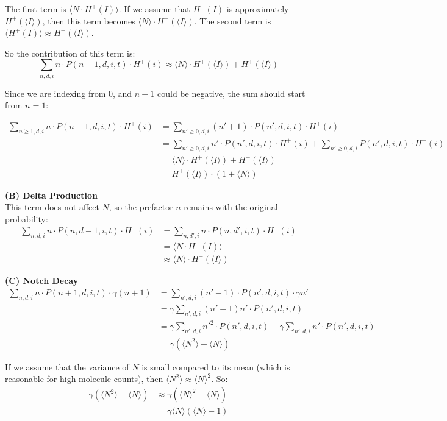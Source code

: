 \documentclass{article}
\begin{document}
\begin{flushleft}
The first term is $\langle N \cdot H^+(I) \rangle$. If we assume that $H^+(I)$ is approximately $H^+(\langle I \rangle)$, then this term becomes $\langle N \rangle \cdot H^+(\langle I \rangle)$. The second term is $\langle H^+(I) \rangle \approx H^+(\langle I \rangle)$. 

So the contribution of this term is:
\[
\sum_{n,d,i} n \cdot P(n-1,d,i,t) \cdot H^+(i) \approx \langle N \rangle \cdot H^+(\langle I \rangle) + H^+(\langle I \rangle)
\]

Since we are indexing from 0, and $n-1$ could be negative, the sum should start from $n=1$:

\begin{small}
\begin{align*}
\sum_{n \geq 1,d,i} n \cdot P(n-1,d,i,t) \cdot H^+(i) &= \sum_{n' \geq 0,d,i} (n'+1) \cdot P(n',d,i,t) \cdot H^+(i) \\
&= \sum_{n' \geq 0,d,i} n' \cdot P(n',d,i,t) \cdot H^+(i) + \sum_{n' \geq 0,d,i} P(n',d,i,t) \cdot H^+(i) \\
&= \langle N \rangle \cdot H^+(\langle I \rangle) + H^+(\langle I \rangle) \\
&= H^+(\langle I \rangle) \cdot (1 + \langle N \rangle)
\end{align*}
\end{small}

\textbf{(B) Delta Production}\\
This term does not affect $N$, so the prefactor $n$ remains with the original probability:
\begin{align*}
\sum_{n,d,i} n \cdot P(n,d-1,i,t) \cdot H^-(i) &= \sum_{n,d',i} n \cdot P(n,d',i,t) \cdot H^-(i) \\
&= \langle N \cdot H^-(I) \rangle \\
&\approx \langle N \rangle \cdot H^-(\langle I \rangle)
\end{align*}

\textbf{(C) Notch Decay}
\begin{align*}
\sum_{n,d,i} n \cdot P(n+1,d,i,t) \cdot \gamma(n+1) &= \sum_{n',d,i} (n'-1) \cdot P(n',d,i,t) \cdot \gamma n' \\
&= \gamma \sum_{n',d,i} (n'-1)n' \cdot P(n',d,i,t) \\
&= \gamma \sum_{n',d,i} n'^2 \cdot P(n',d,i,t) - \gamma \sum_{n',d,i} n' \cdot P(n',d,i,t) \\
&= \gamma(\langle N^2 \rangle - \langle N \rangle)
\end{align*}

If we assume that the variance of $N$ is small compared to its mean (which is reasonable for high molecule counts), then $\langle N^2 \rangle \approx \langle N \rangle^2$. So:
\begin{align*}
\gamma(\langle N^2 \rangle - \langle N \rangle) &\approx \gamma(\langle N \rangle^2 - \langle N \rangle) \\
&= \gamma \langle N \rangle (\langle N \rangle - 1)
\end{align*}


\end{flushleft}
\end{document}
